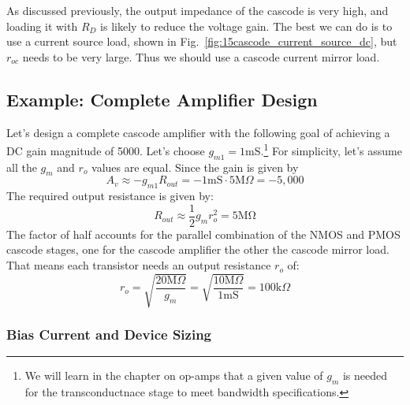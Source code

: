 As discussed previously, the output impedance of the cascode is very high, and loading it with $R_D$ is likely to reduce the voltage gain.  The best we can do is to use a current source load, shown in Fig.~\ref{fig:15cascode_current_source_dc}, but $r_{oc}$ needs to be very large. Thus we should use a cascode current mirror load.
 



\subsection{Example:  Complete Amplifier Design}

Let's design a complete cascode amplifier with the following goal of achieving a DC gain magnitude of 5000.   Let's choose $g_{m1} = 1$mS.\footnote{We will learn in the chapter on op-amps that a given value of $g_m$ is needed for the transconductnace stage to meet bandwidth specifications.} For simplicity, let's assume all the $g_m$ and $r_o$ values are equal.  Since the gain is given by
% 
\begin{equation} 
	{A_v} \approx  - {g_{m1}}{R_{out}} =  - 1\mathrm{mS} \cdot 5\mathrm{M}\Omega  =  - 5,000 
\end{equation}
%
The required output resistance is given by:
%
\begin{equation} 
	{R_{out}} \approx \frac{1}{2}{g_m}r_o^2 = 5\mathrm{M\Omega} 
\end{equation}
%
The factor of half accounts for the parallel combination of the NMOS and PMOS cascode stages, one for the cascode amplifier the other the cascode mirror load.  That means each transistor needs an output resistance $r_o$ of:
%
\begin{equation} 
	{r_o} = \sqrt {\frac{{20\mathrm{M}\Omega }}{{{g_m}}}}  = \sqrt {\frac{{10\mathrm{M}\Omega }}
								{{1\mathrm{mS}}}}  = 100\mathrm{k}\Omega 
\end{equation}




\subsubsection{Bias Current and Device Sizing}

